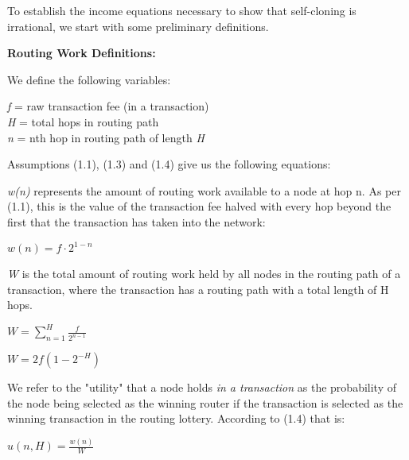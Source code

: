 \documentclass[oneside]{article}   	%
\begin{document}
\begin{multicols}{2}
To establish the income equations necessary to show that self-cloning is irrational, we start with some preliminary definitions.

\textbf{Routing Work Definitions:}

We define the following variables:

\begin{adjustwidth}{1.5em}{1.5em} 
	\textit{f} = raw transaction fee (in a transaction) \\
	\textit{H} = total hops in routing path \\
	\textit{n} = nth hop in routing path of length \textit{H}
\end{adjustwidth}

Assumptions (1.1), (1.3) and (1.4) give us the following equations:

\textit{w(n)} represents the amount of routing work available to a node at hop n. As per (1.1), this is the value of the transaction fee halved with every hop beyond the first that the transaction has taken into the network:

\large
\begin{adjustwidth}{1.5em}{1.5em} 
	\begin{math}
	 w(n) = f \cdot 2^{1-n}
	\end{math}
\end{adjustwidth}
\normalsize

\textit{W} is the total amount of routing work held by all nodes in the routing path of a transaction, where the transaction has a routing path with a total length of H hops.

\large
\begin{adjustwidth}{1.5em}{1.5em} 
	\begin{math}
	W = \sum_{n=1}^{H} \frac{f}{2^{n-1}}
	\end{math}

	\begin{math}
	W = 2f\left(1-2^{-H}\right)
	\end{math}
\end{adjustwidth}
\normalsize

We refer to the "utility" that a node holds \textit{in a transaction} as the probability of the node being selected as the winning router if the transaction is selected as the winning transaction in the routing lottery. According to (1.4) that is:

\large
\begin{adjustwidth}{1.5em}{1.5em} 
	\begin{math}
	u(n, H) = \frac{w(n)}{W}
	\end{math}


\end{adjustwidth}
\end{multicols}
\end{document}
